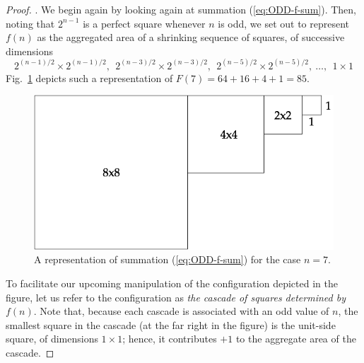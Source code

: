 \begin{proof}
.
We begin again by looking again at summation (\ref{eq:ODD-f-sum}).  Then, noting that $2^{n-1}$ is a perfect square whenever $n$ is odd, we set out to represent $f(n)$ as the aggregated area of a shrinking sequence of squares, of successive dimensions
\[ 2^{(n-1)/2} \times 2^{(n-1)/2}, \ \ 2^{(n-3)/2} \times 2^{(n-3)/2},
\ \ 2^{(n-5)/2} \times 2^{(n-5)/2}, \
\ldots, \ \  1 \times 1
\]
Fig.~\ref{fig:alternatePowers2odd} depicts such a representation of $F(7) = 64+16+4+1 = 85$.
\begin{figure} [htb]
\begin{center}
        \includegraphics[scale=0.35]{FiguresMaths/alternatePowers2initOdd.png}
\caption{A representation of summation (\ref{eq:ODD-f-sum}) for the case $n=7$.}
        \label{fig:alternatePowers2odd}
\end{center}
\end{figure}
To facilitate our upcoming manipulation of the configuration depicted in the figure, let us refer to the configuration as {\it the cascade of squares determined by $f(n)$}.   Note that, because each cascade is associated with an odd value of $n$, the smallest square in the cascade (at the far right in the figure) is the unit-side square, of dimensions $1 \times 1$; hence, it contributes $+1$ to the aggregate area of the cascade.

\smallskip


\end{proof}
